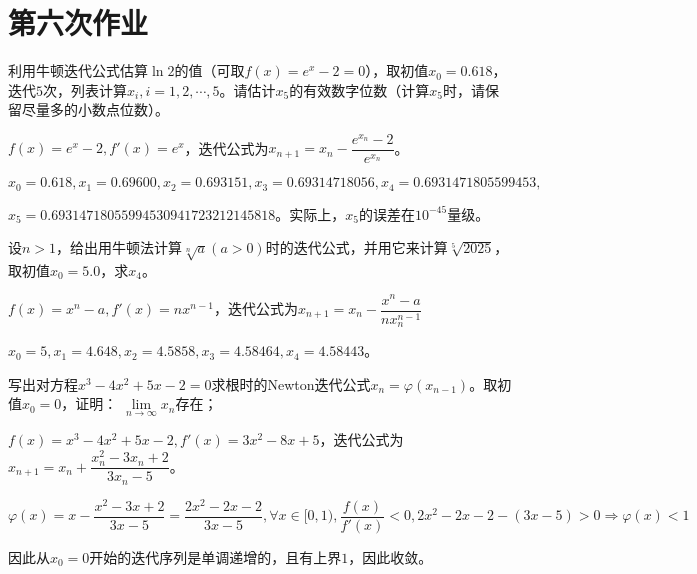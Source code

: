 \chapter{第六次作业}

    \begin{homework}[6pts]
        利用牛顿迭代公式估算$\ln 2$的值（可取$f(x)=e^x-2=0$），取初值$x_0=0.618$，迭代$5$次，列表计算$x_i, i=1,2,\cdots,5$。请估计$x_5$的有效数字位数（计算$x_5$时，请保留尽量多的小数点位数）。
    \end{homework}

    \begin{solution}
        $f(x)=e^x-2,f'(x)=e^x$，迭代公式为$x_{n+1}=x_n-\dfrac{e^{x_n}-2}{e^{x_n}}$。

        $x_0=0.618,x_1=0.69600,x_2=0.693151,x_3=0.69314718056,x_4=0.6931471805599453,$

        $x_5=0.69314718055994530941723212145818$。实际上，$x_5$的误差在$10^{-45}$量级。
    \end{solution}

    \begin{homework}[6pts]
        设$n>1$，给出用牛顿法计算$\sqrt[n]{a}(a>0)$时的迭代公式，并用它来计算$\sqrt[5]{2025}$，取初值$x_0=5.0$，求$x_4$。
    \end{homework}

    \begin{solution}
        $f(x)=x^n-a,f'(x)=nx^{n-1}$，迭代公式为$x_{n+1}=x_n-\dfrac{x^n-a}{nx_n^{n-1}}$

        $x_0=5,x_1=4.648,x_2=4.5858,x_3=4.58464,x_4=4.58443$。
    \end{solution}

    \begin{homework}[10pts]
        写出对方程$x^3-4x^2+5x-2=0$求根时的Newton迭代公式$x_n=\varphi(x_{n-1})$。取初值$x_0=0$，证明： $\lim\limits_{n\rightarrow\infty}x_n$存在；
    \end{homework}

    \begin{solution}
        $f(x)=x^3-4x^2+5x-2,f'(x)=3x^2-8x+5$，迭代公式为$x_{n+1}=x_n+\dfrac{x_n^2-3x_n+2}{3x_n-5}$。

        $\varphi(x)=x-\dfrac{x^2-3x+2}{3x-5}=\dfrac{2x^2-2x-2}{3x-5},\forall x\in[0,1),\dfrac{f(x)}{f'(x)}<0,2x^2-2x-2-(3x-5)>0\Rightarrow\varphi(x)<1$

        因此从$x_0=0$开始的迭代序列是单调递增的，且有上界$1$，因此收敛。
    \end{solution}

